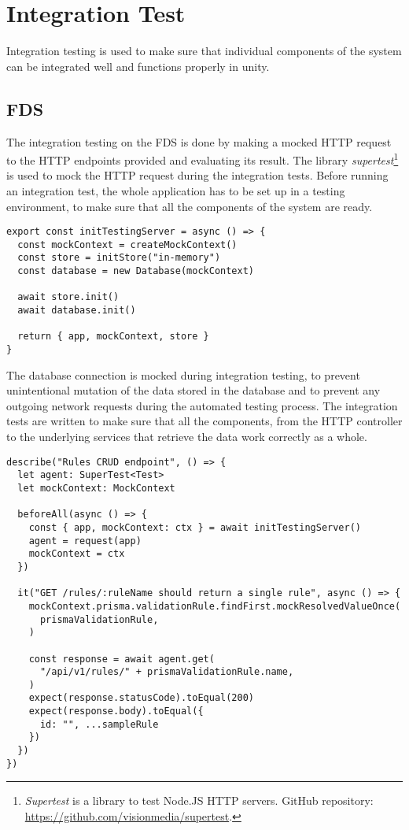 \section{Integration Test}

  Integration testing is used to make sure that individual components of the system can be integrated well and functions properly in unity. 

  \subsection{FDS}

    The integration testing on the FDS is done by making a mocked HTTP request to the HTTP endpoints provided and evaluating its result. The library \emph{supertest}\footnote{\emph{Supertest} is a library to test Node.JS HTTP servers. GitHub repository: \url{https://github.com/visionmedia/supertest}.} is used to mock the HTTP request during the integration tests. Before running an integration test, the whole application has to be set up in a testing environment, to make sure that all the components of the system are ready.

    \begin{lstlisting}[style=es6, caption={Setting up a testing server environment for integration test (TypeScript)}]
export const initTestingServer = async () => {
  const mockContext = createMockContext()
  const store = initStore("in-memory")
  const database = new Database(mockContext)

  await store.init()
  await database.init()

  return { app, mockContext, store }
}
\end{lstlisting}

    The database connection is mocked during integration testing, to prevent unintentional mutation of the data stored in the database and to prevent any outgoing network requests during the automated testing process. The integration tests are written to make sure that all the components, from the HTTP controller to the underlying services that retrieve the data work correctly as a whole.

    \begin{lstlisting}[style=es6, caption={Integration testing on the FDS (TypeScript)}]
describe("Rules CRUD endpoint", () => {
  let agent: SuperTest<Test>
  let mockContext: MockContext

  beforeAll(async () => {
    const { app, mockContext: ctx } = await initTestingServer()
    agent = request(app)
    mockContext = ctx
  })

  it("GET /rules/:ruleName should return a single rule", async () => {
    mockContext.prisma.validationRule.findFirst.mockResolvedValueOnce(
      prismaValidationRule,
    )

    const response = await agent.get(
      "/api/v1/rules/" + prismaValidationRule.name,
    )
    expect(response.statusCode).toEqual(200)
    expect(response.body).toEqual({
      id: "", ...sampleRule 
    })
  })
})
\end{lstlisting}

